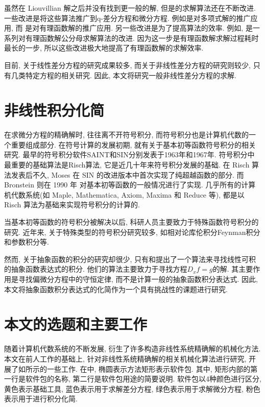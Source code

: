虽然在 Liouvillian 解之后并没有找到更一般的解, 但是的求解算法还在不断改进. 一些改进是将这些算法推广到q-差分方程和微分方程. 例如是对多项式解的推广应用, 而 是对有理函数解的推广应用. 另一些改进是为了提高算法的效率. 例如,  是一系列对有理函数解公分母求解算法的改进. 因为这一步是有理函数解求解过程耗时最长的一步, 所以这些改进极大地提高了有理函数解的求解效率. 

目前, 关于线性差分方程的研究成果较多, 而关于非线性差分方程的研究则较少, 只有几类特定方程的相关研究\cite{chen2011some,ishizaki2011difference}. 因此, 本文将研究一般非线性差分方程的求解. 

\section{非线性积分化简}
在求微分方程的精确解时, 往往离不开符号积分, 而符号积分也是计算机代数的一个重要组成部分. 在符号计算的发展初期, 就有关于基本初等函数符号积分的相关研究. 最早的符号积分软件SAINT和SIN分别发表于1963年\cite{slagle1963}和1967年\cite{moses1967}. 符号积分中最重要的基础算法是Risch算法\cite{risch1969,risch1970}, 它是近几十年来符号积分发展的基础. 在 Risch 算法发表后不久, Moses 在 SIN 的改进版本中首次实现了纯超越函数的部分\cite{moses1971}. 而 Bronstein 则在 1990 年\cite{bronstein1990} 对基本初等函数的一般情况进行了实现. 几乎所有的计算机代数系统(如 Maple, Mathematica, Axiom, Maxima 和 Reduce 等), 都是以 Risch 算法为基础来实现符号积分的计算的. 

当基本初等函数的符号积分被解决以后, 科研人员主要致力于特殊函数符号积分的研究\cite{cherry1985,cherry1986,bertrand1994,jeffrey1997}. 近年来, 关于特殊类型的符号积分研究较多, 如相对论库伦积分\cite{paule2012,paule2013}\D Feynman积分\cite{blumlein2012,smirnov2015}和参数积分\cite{raab2016}等.

然而, 关于抽象函数的积分的研究却很少, 只有和提出了一个算法来寻找线性可积的抽象函数表达式的积分. 他们的算法主要致力于寻找方程$D_x f=g$的解. 其主要作用是寻找偏微分方程中的守恒定律\cite{poole2011}, 而不是计算一般的抽象函数积分表达式. 因此, 本文将抽象函数积分表达式的化简作为一个具有挑战性的课题进行研究.

\section{本文的选题和主要工作}
随着计算机代数系统的不断发展, 衍生了许多构造非线性系统精确解的机械化方法. 本文在前人工作的基础上, 针对非线性系统精确解的相关机械化算法进行研究, 开展了如所示的一些工作. 在中, 椭圆表示方法\D 矩形表示软件包. 其中, 矩形内部的第一行是软件包的名称, 第二行是软件包用途的简要说明. 软件包以4种颜色进行区分, 黄色表示基础工具, 蓝色表示用于求解差分方程, 绿色表示用于求解微分方程, 粉色表示用于进行积分化简. 

